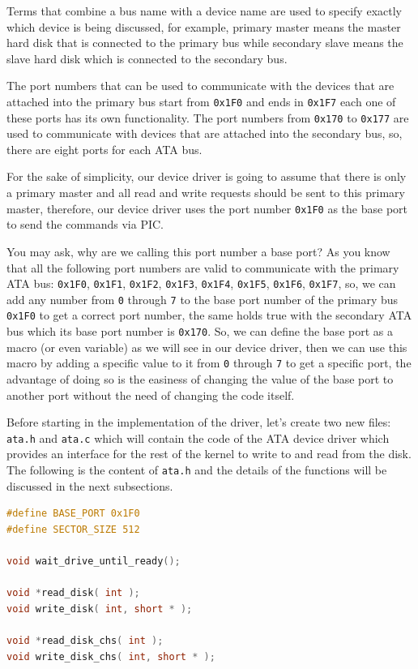 Terms that combine a bus name with a device name are used to specify
exactly which device is being discussed, for example, primary master
means the master hard disk that is connected to the primary bus while
secondary slave means the slave hard disk which is connected to the
secondary bus.

The port numbers that can be used to communicate with the devices that
are attached into the primary bus start from \lstinline!0x1F0! and ends
in \lstinline!0x1F7! each one of these ports has its own functionality.
The port numbers from \lstinline!0x170! to \lstinline!0x177! are used to
communicate with devices that are attached into the secondary bus, so,
there are eight ports for each ATA bus.

For the sake of simplicity, our device driver is going to assume that
there is only a primary master and all read and write requests should be
sent to this primary master, therefore, our device driver uses the port
number \lstinline!0x1F0! as the base port to send the commands via PIC.

You may ask, why are we calling this port number a base port? As you
know that all the following port numbers are valid to communicate with
the primary ATA bus: \lstinline!0x1F0!, \lstinline!0x1F1!,
\lstinline!0x1F2!, \lstinline!0x1F3!, \lstinline!0x1F4!,
\lstinline!0x1F5!, \lstinline!0x1F6!, \lstinline!0x1F7!, so, we can add
any number from \lstinline!0! through \lstinline!7! to the base port
number of the primary bus \lstinline!0x1F0! to get a correct port
number, the same holds true with the secondary ATA bus which its base
port number is \lstinline!0x170!. So, we can define the base port as a
macro (or even variable) as we will see in our device driver, then we
can use this macro by adding a specific value to it from \lstinline!0!
through \lstinline!7! to get a specific port, the advantage of doing so
is the easiness of changing the value of the base port to another port
without the need of changing the code itself.

Before starting in the implementation of the driver, let's create two
new files: \lstinline!ata.h! and \lstinline!ata.c! which will contain
the code of the ATA device driver which provides an interface for the
rest of the kernel to write to and read from the disk. The following is
the content of \lstinline!ata.h! and the details of the functions will
be discussed in the next subsections.

\begin{lstlisting}[language=C]
#define BASE_PORT 0x1F0
#define SECTOR_SIZE 512

void wait_drive_until_ready();

void *read_disk( int );
void write_disk( int, short * );

void *read_disk_chs( int );
void write_disk_chs( int, short * );
\end{lstlisting}

